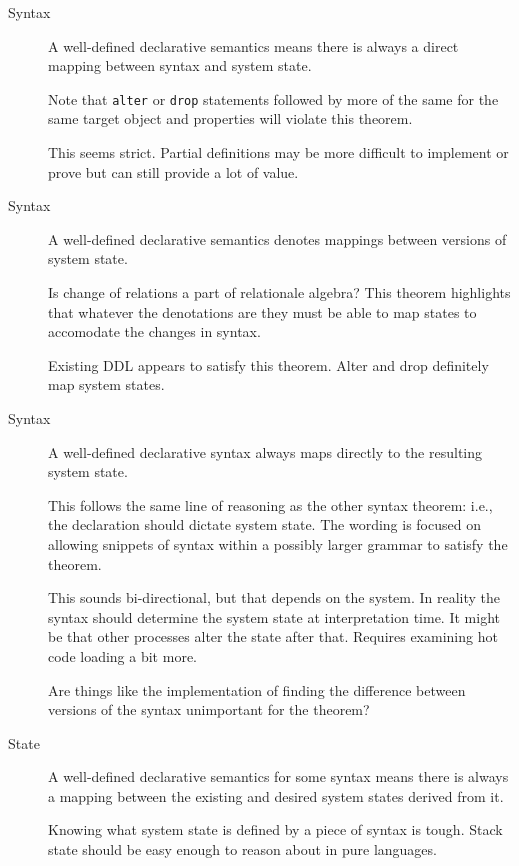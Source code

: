\documentclass[12pt]{article}
\begin{document}
\begin{description}
  \item[Syntax] A well-defined declarative semantics means there is always a direct mapping between syntax and system state.

    Note that \verb|alter| or \verb|drop| statements followed by more of the same for the same target object and properties will violate this theorem.

    This seems strict. Partial definitions may be more difficult to implement or prove but can still provide a lot of value.

    \vspace{0.5cm}

  \item[Syntax] A well-defined declarative semantics denotes mappings between versions of system state.

    Is change of relations a part of relationale algebra? This theorem highlights that whatever the denotations are they must be able to map states to accomodate the changes in syntax.

    Existing DDL appears to satisfy this theorem. Alter and drop definitely map system states.

    \vspace{0.5cm}

  \item[Syntax] A well-defined declarative syntax always maps directly to the resulting system state.

    This follows the same line of reasoning as the other syntax theorem: i.e., the declaration should dictate system state. The wording is focused on allowing snippets of syntax within a possibly larger grammar to satisfy the theorem.

    This sounds bi-directional, but that depends on the system. In reality the syntax should determine the system state at interpretation time. It might be that other processes alter the state after that. Requires examining hot code loading a bit more.

    Are things like the implementation of finding the difference between versions of the syntax unimportant for the theorem?

    \vspace{0.5cm}

  \item[State] A well-defined declarative semantics for some syntax means there is always a mapping between the existing and desired system states derived from it.

    Knowing what system state is defined by a piece of syntax is tough. Stack state should be easy enough to reason about in pure languages.
\end{description}
\end{document}

